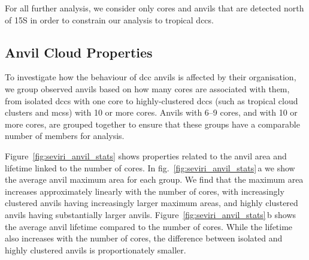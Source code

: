 \documentclass[acp, manuscript]{copernicus}
\begin{document}
For all further analysis, we consider only cores and anvils that are detected north of 15\textdegree S in order to constrain our analysis to tropical \acrshort{dcc}s.

\subsection{Anvil Cloud Properties}

To investigate how the behaviour of \acrshort{dcc} anvils is affected by their organisation, we group observed anvils based on how many cores are associated with them, from isolated \acrshort{dcc}s with one core to highly-clustered \acrshort{dcc}s (such as tropical cloud clusters and \acrshort{mcs}s) with 10 or more cores. 
Anvils with 6--9 cores, and with 10 or more cores, are grouped together to ensure that these groups have a comparable number of members for analysis.

Figure~\ref{fig:seviri_anvil_stats} shows properties related to the anvil area and lifetime linked to the number of cores. 
In fig.~\ref{fig:seviri_anvil_stats}\,a we show the average anvil maximum area for each group. 
We find that the maximum area increases approximately linearly with the number of cores, with increasingly clustered anvils having increasingly larger maximum areas, and highly clustered anvils having substantially larger anvils. 
Figure~\ref{fig:seviri_anvil_stats}\,b shows the average anvil lifetime compared to the number of cores. 
While the lifetime also increases with the number of cores, the difference between isolated and highly clustered anvils is proportionately smaller.
\end{document}

